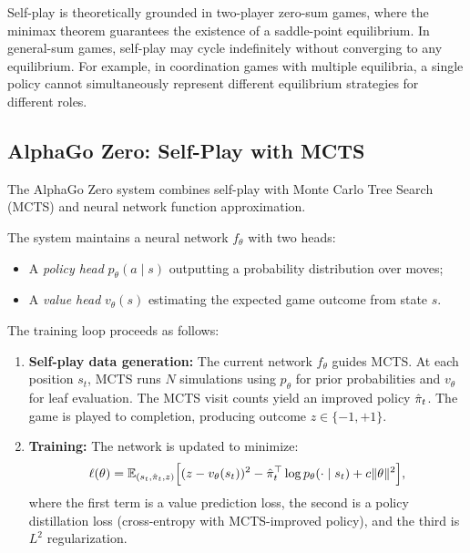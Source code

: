 \documentclass[11pt,a4paper]{article}
\begin{document}
\begin{rlconnection}
Self-play is theoretically grounded in two-player zero-sum games, where
the minimax theorem guarantees the existence of a saddle-point
equilibrium.  In general-sum games, self-play may cycle indefinitely
without converging to any equilibrium.  For example, in coordination
games with multiple equilibria, a single policy cannot simultaneously
represent different equilibrium strategies for different roles.
\end{rlconnection}

\subsection{AlphaGo Zero: Self-Play with MCTS}

The AlphaGo Zero system \citep{silver2017} combines self-play with Monte
Carlo Tree Search (MCTS) and neural network function approximation.

\begin{definition}
\label{def:alphagozero}
The system maintains a neural network $f_\theta$ with two heads:
\begin{itemize}
  \item A \emph{policy head} $p_\theta(a \mid s)$ outputting a
    probability distribution over moves;
  \item A \emph{value head} $v_\theta(s)$ estimating the expected game
    outcome from state $s$.
\end{itemize}
The training loop proceeds as follows:
\begin{enumerate}
  \item \textbf{Self-play data generation:} The current network
    $f_\theta$ guides MCTS.  At each position $s_t$, MCTS runs $N$
    simulations using $p_\theta$ for prior probabilities and $v_\theta$
    for leaf evaluation.  The MCTS visit counts yield an improved policy
    $\hat{\pi}_t$.  The game is played to completion, producing
    outcome $z \in \{-1, +1\}$.
  \item \textbf{Training:} The network is updated to minimize:
    \begin{equation}
    \label{eq:alphago-loss}
      \ell(\theta) = \mathbb{E}_{(s_t, \hat{\pi}_t, z)}
      \Bigl[ (z - v_\theta(s_t))^2
        - \hat{\pi}_t^\top \log p_\theta(\cdot \mid s_t)
        + c \|\theta\|^2 \Bigr],
    \end{equation}
    where the first term is a value prediction loss, the second is a
    policy distillation loss (cross-entropy with MCTS-improved policy),
    and the third is $L^2$ regularization.
\end{enumerate}
\end{definition}
\end{document}
